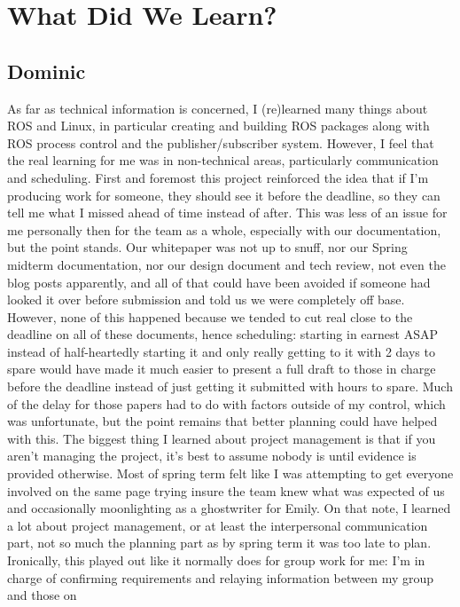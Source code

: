 \documentclass[IEEEtran,letterpaper,10pt,notitlepage,draftclsnofoot,onecolumn]{article}
\begin{document}
\section{What Did We Learn?}
\subsection{Dominic}
As far as technical information is concerned, I (re)learned many
things about ROS and Linux, in particular creating and building 
ROS packages along with ROS process control and the publisher/subscriber 
system. However, I feel that the real learning for me was in 
non-technical areas, particularly communication and scheduling. First 
and foremost this project reinforced the idea that if I’m producing 
work for someone, they should see it before the deadline, so they 
can tell me what I missed ahead of time instead of after. This was less 
of an issue for me personally then for the team as a whole, especially 
with our documentation, but the point stands. Our whitepaper was not 
up to snuff, nor our Spring midterm documentation, nor our design document 
and tech review, not even the blog posts apparently, and all of that could 
have been avoided if someone had looked it over before submission and told 
us we were completely off base. However, none of this happened because we 
tended to cut real close to the deadline on all of these documents, hence 
scheduling: starting in earnest ASAP instead of half-heartedly starting it 
and only really getting to it with 2 days to spare would have made it much 
easier to present a full draft to those in charge before the deadline instead 
of just getting it submitted with hours to spare. Much of the delay for those 
papers had to do with factors outside of my control, which was unfortunate, but 
the point remains that better planning could have helped with this. The biggest 
thing I learned about project management is that if you aren’t managing the 
project, it’s best to assume nobody is until evidence is provided otherwise. 
Most of spring term felt like I was attempting to get everyone involved on the 
same page trying insure the team knew what was expected of us and occasionally 
moonlighting as a ghostwriter for Emily. On that note, I learned a lot about 
project management, or at least the interpersonal communication part, not so 
much the planning part as by spring term it was too late to plan. Ironically, 
this played out like it normally does for group work for me: I’m in charge of 
confirming requirements and relaying information between my group and those on 
\end{document}
